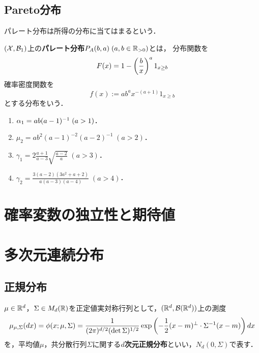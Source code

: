 \documentclass[uplatex,dvipdfmx]{jsreport}
\begin{document}
\subsection{Pareto分布}

\begin{tcolorbox}[colframe=ForestGreen, colback=ForestGreen!10!white,breakable,colbacktitle=ForestGreen!40!white,coltitle=black,fonttitle=\bfseries\sffamily,
title=]
    パレート分布は所得の分布に当てはまるという．
\end{tcolorbox}

\begin{definition}
    $(\mathcal{X},\mathcal{B}_1)$上の\textbf{パレート分布}$P_A(b,a)\;(a,b\in\mathbb{R}_{>0})$とは，
    分布関数を
    \[F(x)=1-\left(\frac{b}{x}\right)^a1_{x\ge b}\]
    確率密度関数を
    \[f(x):=ab^ax^{-(a+1)}1_{x\ge b}\]
    とする分布をいう．
\end{definition}

\begin{proposition}\mbox{}
    \begin{enumerate}
        \item $\alpha_1=ab(a-1)^{-1}\;(a>1)$．
        \item $\mu_2=ab^2(a-1)^{-2}(a-2)^{-1}\;(a>2)$．
        \item $\gamma_1=2\frac{a+1}{a-3}\sqrt{\frac{a-2}{a}}\;(a>3)$．
        \item $\gamma_2=\frac{3(a-2)(3a^2+a+2)}{a(a-3)(a-4)}\;(a>4)$．
    \end{enumerate}
\end{proposition}

\section{確率変数の独立性と期待値}

\section{多次元連続分布}

\subsection{正規分布}

\begin{definition}
    $\mu\in\mathbb{R}^d$，$\Sigma\in M_d(\mathbb{R})$を正定値実対称行列として，$(\mathbb{R}^d,\mathcal{B}(\mathbb{R}^d))$上の測度
    \[\mu_{\mu,\Sigma}(dx)=\phi(x;\mu,\Sigma)=\frac{1}{(2\pi)^{d/2}(\det\Sigma)^{1/2}}\exp\left(-\frac{1}{2}(x-m)^\perp\cdot\Sigma^{-1}(x-m)\right)dx\]
    を，平均値$\mu$，共分散行列$\Sigma$に関する\textbf{$d$次元正規分布}といい，$N_d(0,\Sigma)$で表す．
\end{definition}
\end{document}
